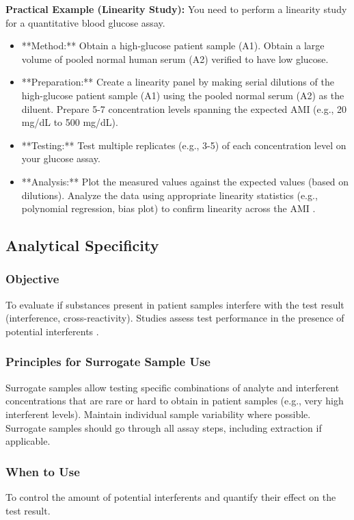 \documentclass{article}
\begin{document}
\textbf{Practical Example (Linearity Study):}
You need to perform a linearity study for a quantitative blood glucose assay.
\begin{itemize}
    \item **Method:** Obtain a high-glucose patient sample (A1). Obtain a large volume of pooled normal human serum (A2) verified to have low glucose.
    \item **Preparation:** Create a linearity panel by making serial dilutions of the high-glucose patient sample (A1) using the pooled normal serum (A2) as the diluent. Prepare 5-7 concentration levels spanning the expected AMI (e.g., 20 mg/dL to 500 mg/dL).
    \item **Testing:** Test multiple replicates (e.g., 3-5) of each concentration level on your glucose assay.
    \item **Analysis:** Plot the measured values against the expected values (based on dilutions). Analyze the data using appropriate linearity statistics (e.g., polynomial regression, bias plot) to confirm linearity across the AMI \cite{CLSIEP06}.
\end{itemize}

\subsection{Analytical Specificity}

\subsubsection{Objective}
To evaluate if substances present in patient samples interfere with the test result (interference, cross-reactivity). Studies assess test performance in the presence of potential interferents \cite{CLSIEP07}.

\subsubsection{Principles for Surrogate Sample Use}
Surrogate samples allow testing specific combinations of analyte and interferent concentrations that are rare or hard to obtain in patient samples (e.g., very high interferent levels). Maintain individual sample variability where possible. Surrogate samples should go through all assay steps, including extraction if applicable.

\subsubsection{When to Use}
To control the amount of potential interferents and quantify their effect on the test result.
\end{document}

